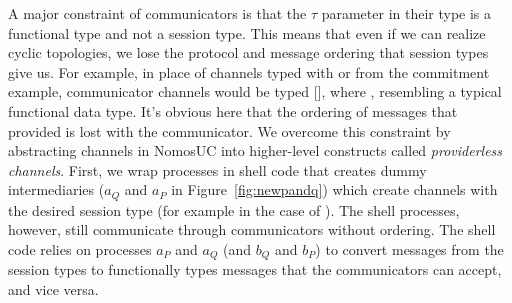 

A major constraint of communicators is that the $\tau$ parameter in their type is a functional type
and not a session type. This means that even if we can realize cyclic topologies, we lose the protocol and message ordering
that session types give us. 
For example, in place of channels typed with  or  from the commitment example, communicator channels would be typed [], where 
,
resembling a typical functional data type.
It's obvious here that the ordering of messages that  provided is lost with the communicator.
We overcome this constraint by abstracting channels in NomosUC into higher-level constructs called \emph{providerless channels}.
First, we wrap processes in shell code that creates dummy intermediaries ($a_Q$ and $a_P$ in Figure~\ref{fig:newpandq}) which
create channels with the desired session type (for example  in the case of \Fcom). The shell processes, however, still communicate through communicators without ordering. 
The shell code relies on processes $a_P$ and $a_Q$ (and $b_Q$ and $b_P$) to convert messages from the session types to 
functionally types messages that the communicators can accept, and vice versa.

